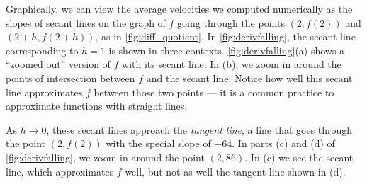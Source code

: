 
Graphically, we can view the average velocities we computed numerically as the slopes of secant lines on the graph of $f$ going through the points $(2,f(2))$ and $(2+h,f(2+h))$, as in \autoref{fig:diff_quotient}. In \autoref{fig:derivfalling}, the secant line corresponding to $h=1$ is shown in three contexts. \autoref{fig:derivfalling}(a) shows a ``zoomed out'' version of $f$ with its secant line. In (b), we zoom in around the points of intersection between $f$ and the secant line. Notice how well this secant line approximates $f$ between those two points --- it is a common practice to approximate functions with straight lines.

As $h\to 0$, these secant lines approach the \textit{tangent line}, a line that goes through the point $(2,f(2))$ with the special slope of $-64$. In parts (c) and (d) of \autoref{fig:derivfalling}, we zoom in around the point $(2,86)$. In (c) we see the secant line, which approximates $f$ well, but not as well the tangent line shown in (d).

